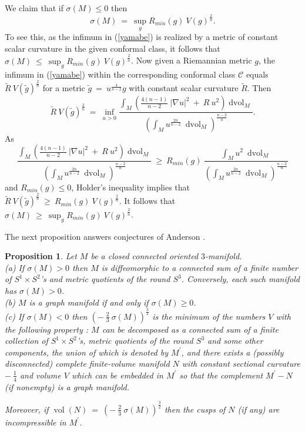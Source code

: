 \documentclass[12pt]{amsart}
\newcommand{\dvol}{\operatorname{dvol}}
\newcommand{\vol}{\operatorname{vol}}
\numberwithin{equation}{section}
\theoremstyle{plain}
\newtheorem{proposition}[equation]{Proposition}
\theoremstyle{definition}
\theoremstyle{remark}
\begin{document}
We claim that if $\sigma(M) \le 0$ then
\begin{equation} \label{testt}
\sigma(M) \: = \: \sup_{g} R_{min}(g) \: V(g)^{\frac2n}.
\end{equation}
To see this, as
the infimum in (\ref{yamabe}) is realized by a metric of constant
scalar curvature in the given conformal class, it follows that 
$\sigma(M) \: \le \: \sup_{g} R_{min}(g) \: V(g)^{\frac2n}$.
Now given a Riemannian metric $g$, the infimum in (\ref{yamabe})
within the corresponding conformal class ${\mathcal C}$ 
equals $\widetilde{R} \: V(\widetilde{g})^{\frac{2}{n}}$
for a metric $\widetilde{g} \: = \: u^{\frac{4}{n-2}} g$ with
constant scalar curvature $\widetilde{R}$. Then
\begin{equation}
\widetilde{R} \: V(\widetilde{g})^{\frac{2}{n}} \: = \: 
\inf_{u > 0} \frac{
\int_M \left(
\frac{4(n-1)}{n-2} \:  |\nabla u|^2 \: + \:
R \: u^2 \right) \dvol_M
}{
\left( \int_M u^{\frac{2n}{n-2}} \: \dvol_M \right)^{\frac{n-2}{n}}}.
\end{equation}
As
\begin{equation}
\frac{ \int_M \left(
\frac{4(n-1)}{n-2} \:  |\nabla u|^2 \: + \:
R \: u^2 \right) \dvol_M
}{
\left( \int_M u^{\frac{2n}{n-2}} \: \dvol_M \right)^{\frac{n-2}{n}}}
\: \ge \: R_{min}(g) \: \frac{
\int_M u^2 \: \dvol_M
}{
\left( \int_M u^{\frac{2n}{n-2}} \: \dvol_M \right)^{\frac{n-2}{n}}}
\end{equation}
and $R_{min}(g) \le 0$,
Holder's inequality implies that
$\widetilde{R} \: V(\widetilde{g})^{\frac{2}{n}} \: \ge \:
{R}_{min}(g) \: V({g})^{\frac{2}{n}}$.
It follows that 
$\sigma(M) \: \ge \: \sup_{g} R_{min}(g) \: V(g)^{\frac2n}$.

The next proposition
answers conjectures of Anderson \cite{Anderson3}.

\begin{proposition} \label{propYamabe}
Let $M$ be a closed connected oriented $3$-manifold. \\
(a) If $\sigma(M) > 0$ then $M$ is
diffeomorphic to a connected sum of a finite number of
$S^1 \times S^2$'s and metric quotients of the round $S^3$.
Conversely, each such manifold has $\sigma(M) > 0$. \\
(b) $M$ is a graph manifold if and only if $\sigma(M)
\ge 0$. \\
(c) If $\sigma(M) < 0$
 then
$\left( - \: \frac23 \: \sigma(M)
\right)^{\frac32}$ is the minimum
of the numbers
$V$ with the following property : $M$ can be decomposed as a connected sum
of a finite collection of $S^1 \times S^2$'s, metric quotients of the round
$S^3$ and some other components, the union of which is denoted by
$M^\prime$, and there exists a (possibly disconnected) complete
finite-volume
manifold $N$ with constant sectional curvature $- \: \frac14$ and
volume $V$ which can be embedded in $M^\prime$ so that the
complement $M^\prime - N$ (if nonempty) is a graph manifold.  

Moreover, if
$\vol(N) \: = \: \left( - \: \frac23 \: \sigma(M)
\right)^{\frac32}$
then the
cusps of $N$ (if any) are incompressible in $M^\prime$. 
\end{proposition}
\end{document}
